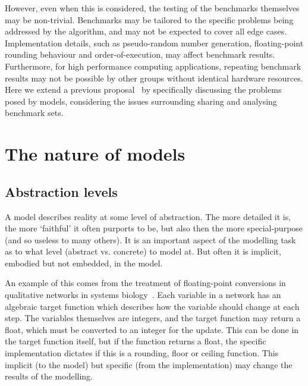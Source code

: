 \documentclass[conference]{IEEEtran}
\begin{document}
However, even when this is considered, the testing of the benchmarks
themselves may be non-trivial. Benchmarks may be tailored to the
specific problems being addressed by the algorithm, and may not be
expected to cover all edge cases. Implementation details, such as
pseudo-random number generation, floating-point rounding behaviour and
order-of-execution, may affect benchmark results. Furthermore, for
high performance computing applications, repeating benchmark results
may not be possible by other groups without identical hardware
resources. Here we extend a previous
proposal~\cite{crick-et-al_wssspe2} by specifically discussing the
problems posed by models, considering the issues surrounding sharing
and analysing benchmark sets.


\section{The nature of models}

\subsection{Abstraction levels} 

A model describes reality at some level of abstraction. The more
detailed it is, the more `faithful' it often purports to be, but also
then the more special-purpose (and so useless to many others). It is
an important aspect of the modelling task as to what level (abstract
vs. concrete) to model at. But often it is implicit, embodied but not
embedded, in the model.

An example of this comes from the treatment of floating-point
conversions in qualitative networks in systems
biology~\cite{Schaub2007}. Each variable in a network has an algebraic
target function which describes how the variable should change at each
step. The variables themselves are integers, and the target function
may return a float, which must be converted to an integer for the
update. This can be done in the target function itself, but if the
function returns a float, the specific implementation dictates if this
is a rounding, floor or ceiling function. This implicit (to the model)
but specific (from the implementation) may change the results of the
modelling.
\end{document}
